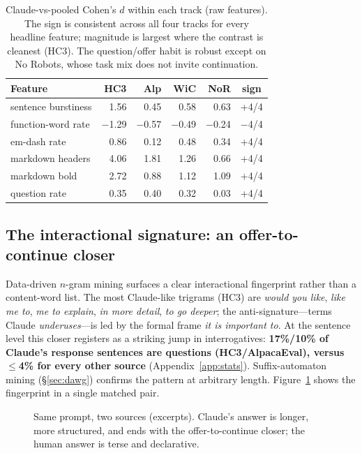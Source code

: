 \documentclass[11pt]{article}
\begin{document}
\begin{table}[t]
\centering\small
\setlength{\tabcolsep}{4pt}
\begin{tabular}{@{}lrrrrc@{}}
\toprule
Feature & HC3 & Alp & WiC & NoR & sign \\
\midrule
sentence burstiness & 1.56 & 0.45 & 0.58 & 0.63 & +4/4 \\
function-word rate & $-$1.29 & $-$0.57 & $-$0.49 & $-$0.24 & $-$4/4 \\
em-dash rate & 0.86 & 0.12 & 0.48 & 0.34 & +4/4 \\
markdown headers & 4.06 & 1.81 & 1.26 & 0.66 & +4/4 \\
markdown bold & 2.72 & 0.88 & 1.12 & 1.09 & +4/4 \\
question rate & 0.35 & 0.40 & 0.32 & 0.03 & +4/4 \\
\bottomrule
\end{tabular}
\caption{Claude-vs-pooled Cohen's $d$ within each track (raw features). The sign
is consistent across all four tracks for every headline feature; magnitude is
largest where the contrast is cleanest (HC3). The question/offer habit is robust
except on No Robots, whose task mix does not invite continuation.}
\label{tab:crosstrack}
\end{table}

\subsection{The interactional signature: an offer-to-continue closer}
\label{sec:ngram}
Data-driven $n$-gram mining \citep{monroe2008fightin} surfaces a clear
interactional fingerprint rather than a content-word list. The most Claude-like
trigrams (HC3) are \emph{would you like}, \emph{like me to}, \emph{me to
explain}, \emph{in more detail}, \emph{to go deeper}; the anti-signature---terms
Claude \emph{underuses}---is led by the formal frame \emph{it is important to}.
At the sentence level this closer registers as a striking jump in interrogatives:
\textbf{17\%/10\% of Claude's response sentences are questions (HC3/AlpacaEval),
versus $\le$4\% for every other source} (Appendix~\ref{app:stats}).
Suffix-automaton mining (\S\ref{sec:dawg}) confirms the pattern at arbitrary
length. Figure~\ref{fig:example} shows the fingerprint in a single matched pair.

\begin{figure}[t]
\small
{}
\caption{Same prompt, two sources (excerpts). Claude's answer is longer, more
structured, and ends with the offer-to-continue closer; the human answer is
terse and declarative.}
\label{fig:example}
\end{figure}
\end{document}
